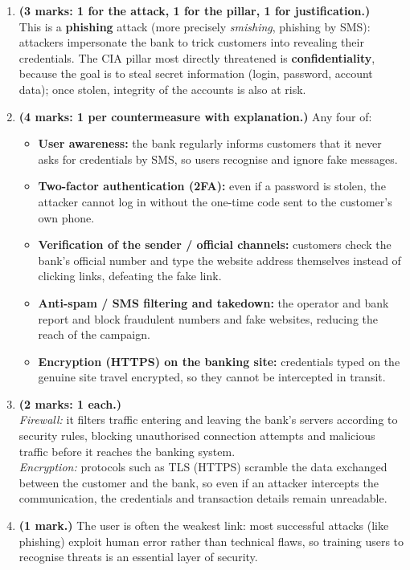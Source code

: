 \documentclass[11pt]{article}
\begin{document}
\begin{corrige}
\begin{enumerate}
\item \textbf{(3 marks: 1 for the attack, 1 for the pillar, 1 for justification.)}\\
This is a \textbf{phishing} attack (more precisely \emph{smishing}, phishing by SMS): attackers impersonate the bank to trick customers into revealing their credentials. The CIA pillar most directly threatened is \textbf{confidentiality}, because the goal is to steal secret information (login, password, account data); once stolen, integrity of the accounts is also at risk.
\item \textbf{(4 marks: 1 per countermeasure with explanation.)} Any four of:
\begin{itemize}
\item \textbf{User awareness:} the bank regularly informs customers that it never asks for credentials by SMS, so users recognise and ignore fake messages.
\item \textbf{Two-factor authentication (2FA):} even if a password is stolen, the attacker cannot log in without the one-time code sent to the customer's own phone.
\item \textbf{Verification of the sender / official channels:} customers check the bank's official number and type the website address themselves instead of clicking links, defeating the fake link.
\item \textbf{Anti-spam / SMS filtering and takedown:} the operator and bank report and block fraudulent numbers and fake websites, reducing the reach of the campaign.
\item \textbf{Encryption (HTTPS) on the banking site:} credentials typed on the genuine site travel encrypted, so they cannot be intercepted in transit.
\end{itemize}
\item \textbf{(2 marks: 1 each.)}\\
\emph{Firewall:} it filters traffic entering and leaving the bank's servers according to security rules, blocking unauthorised connection attempts and malicious traffic before it reaches the banking system.\\
\emph{Encryption:} protocols such as TLS (HTTPS) scramble the data exchanged between the customer and the bank, so even if an attacker intercepts the communication, the credentials and transaction details remain unreadable.
\item \textbf{(1 mark.)} The user is often the weakest link: most successful attacks (like phishing) exploit human error rather than technical flaws, so training users to recognise threats is an essential layer of security.
\end{enumerate}
\end{corrige}
\end{document}
